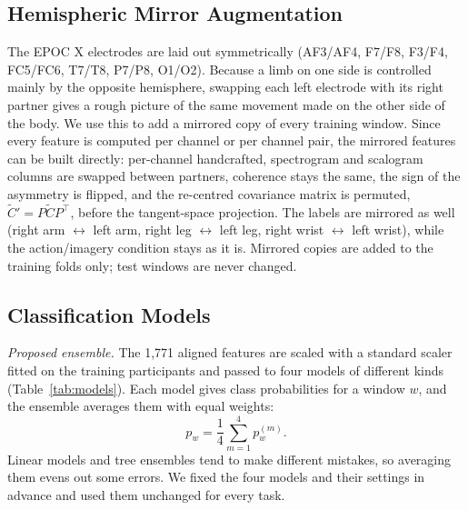 \documentclass[pdflatex,sn-mathphys-num]{sn-jnl}%
\theoremstyle{thmstyleone}%
\theoremstyle{thmstyletwo}%
\theoremstyle{thmstylethree}%
\begin{document}
\subsection{Hemispheric Mirror Augmentation}\label{subsec:mirror}

The EPOC X electrodes are laid out symmetrically (AF3/AF4, F7/F8, F3/F4, FC5/FC6, T7/T8, P7/P8, O1/O2). Because a limb on one side is controlled mainly by the opposite hemisphere, swapping each left electrode with its right partner gives a rough picture of the same movement made on the other side of the body. We use this to add a mirrored copy of every training window. Since every feature is computed per channel or per channel pair, the mirrored features can be built directly: per-channel handcrafted, spectrogram and scalogram columns are swapped between partners, coherence stays the same, the sign of the asymmetry is flipped, and the re-centred covariance matrix is permuted, $\tilde{C}' = P \tilde{C} P^{\top}$, before the tangent-space projection. The labels are mirrored as well (right arm $\leftrightarrow$ left arm, right leg $\leftrightarrow$ left leg, right wrist $\leftrightarrow$ left wrist), while the action/imagery condition stays as it is. Mirrored copies are added to the training folds only; test windows are never changed.

\subsection{Classification Models}\label{subsec:models}

\emph{Proposed ensemble.} The 1,771 aligned features are scaled with a standard scaler fitted on the training participants and passed to four models of different kinds (Table~\ref{tab:models}). Each model gives class probabilities for a window $w$, and the ensemble averages them with equal weights:
\begin{equation}
p_w = \frac{1}{4} \sum_{m=1}^{4} p_w^{(m)}.
\end{equation}
Linear models and tree ensembles tend to make different mistakes, so averaging them evens out some errors. We fixed the four models and their settings in advance and used them unchanged for every task.
\end{document}
